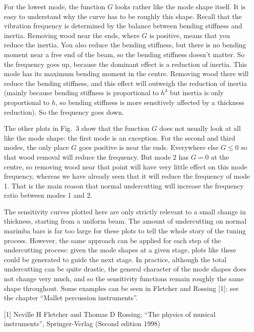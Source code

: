 
  For the lowest mode, the function $G$ looks rather like the mode shape 
  itself. It is easy to understand why the curve has to be roughly this shape. 
  Recall that the vibration frequency is determined by the balance between 
  bending stiffness and inertia. Removing wood near the ends, where $G$ is 
  positive, means that you reduce the inertia. You also reduce the bending 
  stiffness, but there is no bending moment near a free end of the beam, so the 
  bending stiffness doesn't matter. So the frequency goes up, because the 
  dominant effect is a reduction of inertia. This mode has its maximum bending 
  moment in the centre. Removing wood there will reduce the bending stiffness, 
  and this effect will outweigh the reduction of inertia (mainly because 
  bending stiffness is proportional to $h^3$ but inertia is only proportional 
  to $h$, so bending stiffness is more sensitively affected by a thickness 
  reduction). So the frequency goes down. 

  The other plots in Fig.\ 3 show that the function $G$ does not usually look 
  at all like the mode shape: the first mode is an exception. For the second 
  and third modes, the only place $G$ goes positive is near the ends. 
  Everywhere else $G \le 0$ so that wood removal will reduce the frequency. But 
  mode 2 has $G=0$ at the centre, so removing wood near that point will have 
  very little effect on this mode frequency, whereas we have already seen that 
  it will reduce the frequency of mode 1. That is the main reason that normal 
  undercutting will increase the frequency ratio between modes 1 and 2. 

  The sensitivity curves plotted here are only strictly relevant to a small 
  change in thickness, starting from a uniform beam. The amount of undercutting 
  on normal marimba bars is far too large for these plots to tell the whole 
  story of the tuning process. However, the same approach can be applied for 
  each step of the undercutting process: given the mode shapes at a given 
  stage, plots like these could be generated to guide the next stage. In 
  practice, although the total undercutting can be quite drastic, the general 
  character of the mode shapes does not change very much, and so the 
  sensitivity functions remain roughly the same shape throughout. Some examples 
  can be seen in Fletcher and Rossing [1]: see the chapter ``Mallet percussion 
  instruments''. 



  \sectionreferences{}[1] Neville H Fletcher and Thomas D Rossing; ``The 
  physics of musical instruments'', Springer-Verlag (Second edition 1998) 